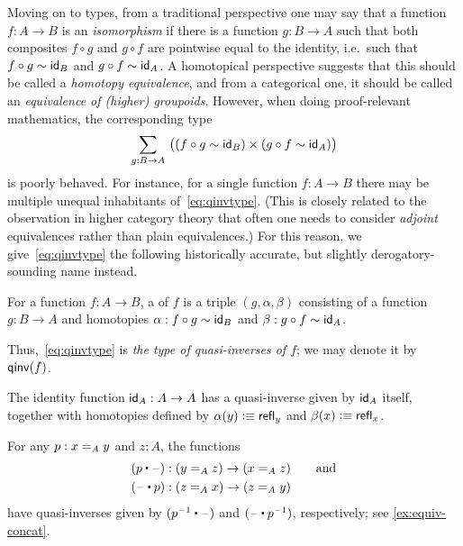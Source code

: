 %

%
Moving on to types, from a traditional perspective one may say that a function $f:A\to B$ is an \emph{isomorphism} if there is a function $g:B\to A$ such that both composites $f\circ g$ and $g\circ f$ are pointwise equal to the identity, i.e.\ such that $f \circ g \htpy \idfunc[B]$ and $g\circ f \htpy \idfunc[A]$.
%
A homotopical perspective suggests that this should be called a \emph{homotopy equivalence}, and from a categorical one, it should be called an \emph{equivalence of (higher) groupoids}.
However, when doing proof-relevant mathematics,
%
the corresponding type
\begin{equation}
  \sm{g:B\to A} \big((f \circ g \htpy \idfunc[B]) \times (g\circ f \htpy \idfunc[A])\big)\label{eq:qinvtype}
\end{equation}
is poorly behaved.
For instance, for a single function $f:A\to B$ there may be multiple unequal inhabitants of~\eqref{eq:qinvtype}.
(This is closely related to the observation in higher category theory that often one needs to consider \emph{adjoint} equivalences rather than plain equivalences.)
For this reason, we give~\eqref{eq:qinvtype} the following historically accurate, but slightly de\-rog\-a\-to\-ry-sounding name instead.

\begin{defn}\label{defn:quasi-inverse}
  For a function $f:A\to B$, a 
  of $f$ is a triple $(g,\alpha,\beta)$ consisting of a function $g:B\to A$ and homotopies
$\alpha:f\circ g\htpy \idfunc[B]$ and $\beta:g\circ f\htpy \idfunc[A]$.
\end{defn}

Thus,~\eqref{eq:qinvtype} is \emph{the type of quasi-inverses of $f$}; we may denote it by $\qinv(f)$.

\begin{eg}\label{eg:idequiv}
  The identity function $\idfunc[A]:A\to A$ has a quasi-inverse given by $\idfunc[A]$ itself, together with homotopies defined by $\alpha(y) \defeq \refl{y}$ and $\beta(x) \defeq \refl{x}$.
\end{eg}

\begin{eg}\label{eg:concatequiv}
  For any $p:\id[A]xy$ and $z:A$, the functions
  \begin{align*}
    (p\ct \blank)&:(\id[A]yz) \to (\id[A]xz) \qquad\text{and}\\
    (\blank \ct p)&:(\id[A]zx) \to (\id[A]zy)
  \end{align*}
  have quasi-inverses given by $(\opp p \ct \blank)$ and $(\blank \ct \opp p)$, respectively; see \cref{ex:equiv-concat}.
\end{eg}

